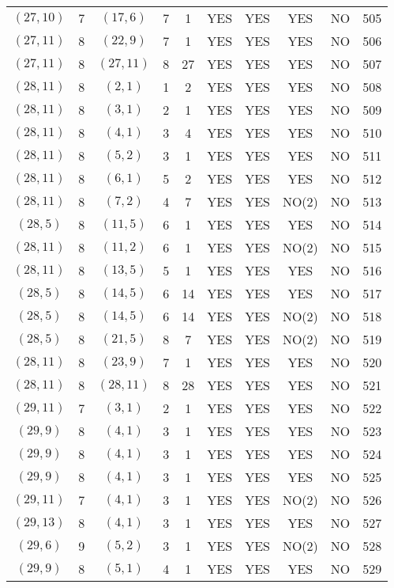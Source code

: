 \begin{longtable}{|c|c|c|c|c|c|c|c|c|c|}
$(27, 10)$ & 7 & $(17, 6)$ & 7 & 1 & YES & YES & YES & NO & 505\\
$(27, 11)$ & 8 & $(22, 9)$ & 7 & 1 & YES & YES & YES & NO & 506\\
$(27, 11)$ & 8 & $(27, 11)$ & 8 & 27 & YES & YES & YES & NO & 507\\
$(28, 11)$ & 8 & $(2, 1)$ & 1 & 2 & YES & YES & YES & NO & 508\\
$(28, 11)$ & 8 & $(3, 1)$ & 2 & 1 & YES & YES & YES & NO & 509\\
$(28, 11)$ & 8 & $(4, 1)$ & 3 & 4 & YES & YES & YES & NO & 510\\
$(28, 11)$ & 8 & $(5, 2)$ & 3 & 1 & YES & YES & YES & NO & 511\\
$(28, 11)$ & 8 & $(6, 1)$ & 5 & 2 & YES & YES & YES & NO & 512\\
$(28, 11)$ & 8 & $(7, 2)$ & 4 & 7 & YES & YES & NO(2) & NO & 513\\
$(28, 5)$ & 8 & $(11, 5)$ & 6 & 1 & YES & YES & YES & NO & 514\\
$(28, 11)$ & 8 & $(11, 2)$ & 6 & 1 & YES & YES & NO(2) & NO & 515\\
$(28, 11)$ & 8 & $(13, 5)$ & 5 & 1 & YES & YES & YES & NO & 516\\
$(28, 5)$ & 8 & $(14, 5)$ & 6 & 14 & YES & YES & YES & NO & 517\\
$(28, 5)$ & 8 & $(14, 5)$ & 6 & 14 & YES & YES & NO(2) & NO & 518\\
$(28, 5)$ & 8 & $(21, 5)$ & 8 & 7 & YES & YES & NO(2) & NO & 519\\
$(28, 11)$ & 8 & $(23, 9)$ & 7 & 1 & YES & YES & YES & NO & 520\\
$(28, 11)$ & 8 & $(28, 11)$ & 8 & 28 & YES & YES & YES & NO & 521\\
$(29, 11)$ & 7 & $(3, 1)$ & 2 & 1 & YES & YES & YES & NO & 522\\
$(29, 9)$ & 8 & $(4, 1)$ & 3 & 1 & YES & YES & YES & NO & 523\\
$(29, 9)$ & 8 & $(4, 1)$ & 3 & 1 & YES & YES & YES & NO & 524\\
$(29, 9)$ & 8 & $(4, 1)$ & 3 & 1 & YES & YES & YES & NO & 525\\
$(29, 11)$ & 7 & $(4, 1)$ & 3 & 1 & YES & YES & NO(2) & NO & 526\\
$(29, 13)$ & 8 & $(4, 1)$ & 3 & 1 & YES & YES & YES & NO & 527\\
$(29, 6)$ & 9 & $(5, 2)$ & 3 & 1 & YES & YES & NO(2) & NO & 528\\
$(29, 9)$ & 8 & $(5, 1)$ & 4 & 1 & YES & YES & YES & NO & 529\\

\end{longtable}
